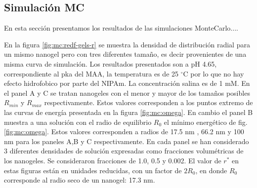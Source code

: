 






\subsection{Simulaci\'on MC}

En esta secci\'on presentamos los resultados de las simulaciones MonteCarlo....

En la figura \ref{fig:mc:redf-gels-r} se muestra la densidad de  distribuci\'on radial para un mismo nanogel pero con tres diferentes tama\~no, es decir  provenientes de una misma curva de simulaci\'on. Los resultados presentados son a pH 4.65, correspondiente al pka del MAA, la temperatura es de 25 $^\circ$C por lo que no hay efecto hidrofobico por parte del NIPAm. La concentraci\'on salina es de 1 mM.
En el panel A y C se tratan nanogeles con el menor y mayor de los tama\~nos posibles $R_{min}$ y $R_{max}$ respectivamente.  Estos valores corresponden a los puntos extremo de las curvas de energ\'ia presentada en la figura \ref{fig:mc:omega}. En cambio el panel B muestra a una soluci\'on con el radio de equilibrio $R_0$ el m\'inimo energ\'etico de fig. \ref{fig:mc:omega}.
 Estos valores corresponden a radios de 17.5 nm , 66.2 nm y 100 nm para los paneles A,B y C respectivamente. En cada panel 
 se han considerado 3 diferentes densidades de soluci\'on expresadas como fracciones volum\'etricas de los nanogeles. Se consideraron fracciones de 1.0, 0.5 y 0.002. 
 El valor de $r^\ast$ en estas figuras est\'an en unidades reducidas, con un factor de $2R_0$, en donde $R_0$ corresponde al radio seco de un nanogel: 17.3 nm. 

